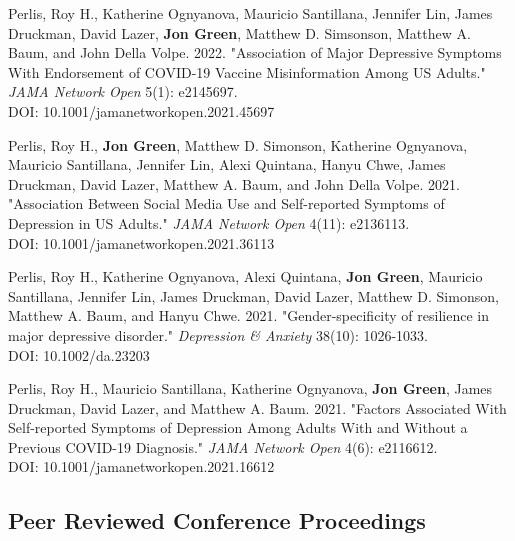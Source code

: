 \documentclass[letterpaper]{article}
\begin{document}
\begin{etaremune}
\item  Perlis, Roy H., Katherine Ognyanova, Mauricio Santillana, Jennifer Lin, James Druckman, David Lazer,  \textbf{Jon Green}, Matthew D. Simsonson, Matthew A. Baum, and John Della Volpe. 2022. "Association of Major Depressive Symptoms With Endorsement of COVID-19 Vaccine Misinformation Among US Adults." \textit{JAMA Network Open} 5(1): e2145697. \\
DOI: 10.1001/jamanetworkopen.2021.45697

\item  Perlis, Roy H., \textbf{Jon Green}, Matthew D. Simonson, Katherine Ognyanova, Mauricio Santillana, Jennifer Lin, Alexi Quintana, Hanyu Chwe, James Druckman, David Lazer, Matthew A. Baum, and John Della Volpe. 2021. "Association Between Social Media Use and Self-reported Symptoms of Depression in US Adults." \textit{JAMA Network Open} 4(11): e2136113. \\
DOI: 10.1001/jamanetworkopen.2021.36113

\item  Perlis, Roy H., Katherine Ognyanova, Alexi Quintana, \textbf{Jon Green}, Mauricio Santillana, Jennifer Lin, James Druckman, David Lazer, Matthew D. Simonson, Matthew A. Baum, and Hanyu Chwe. 2021. "Gender-specificity of resilience in major depressive disorder." \textit{Depression \& Anxiety} 38(10): 1026-1033. \\
DOI: 10.1002/da.23203

\item  Perlis, Roy H., Mauricio Santillana, Katherine Ognyanova, \textbf{Jon Green}, James Druckman, David Lazer, and Matthew A. Baum. 2021. "Factors Associated With Self-reported Symptoms of Depression Among Adults With and Without a Previous COVID-19 Diagnosis." \textit{JAMA Network Open} 4(6): e2116612. \\
DOI: 10.1001/jamanetworkopen.2021.16612
\end{etaremune}

\subsection*{Peer Reviewed Conference Proceedings}
\end{document}
